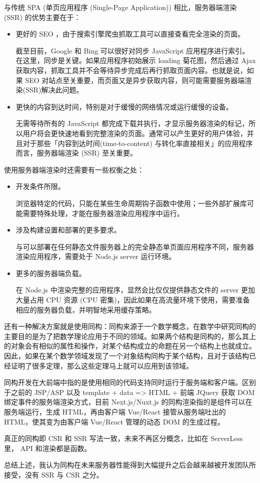 \documentclass{article}
\begin{document}
与传统 SPA (单页应用程序 (Single-Page Application\citep{mikowski2013single})) 相比，服务器端渲染 (SSR) 的优势主要在于：
\begin{itemize}
    \item 更好的 SEO ，由于搜索引擎爬虫抓取工具可以直接查看完全渲染的页面。\par
    截至目前，Google 和 Bing 可以很好对同步 JavaScript 应用程序进行索引。在这里，同步是关键。如果应用程序初始展示 loading 菊花图，然后通过 Ajax 获取内容，抓取工具并不会等待异步完成后再行抓取页面内容。也就是说，如果 SEO 对站点至关重要，而页面又是异步获取内容，则可能需要服务器端渲染(SSR)解决此问题。
    \item 更快的内容到达时间，特别是对于缓慢的网络情况或运行缓慢的设备。\par
    无需等待所有的 JavaScript 都完成下载并执行，才显示服务器渲染的标记，所以用户将会更快速地看到完整渲染的页面。通常可以产生更好的用户体验，并且对于那些「内容到达时间(time-to-content) 与转化率直接相关」的应用程序而言，服务器端渲染 (SSR) 至关重要。
\end{itemize}
使用服务器端渲染时还需要有一些权衡之处：
\begin{itemize}
    \item 开发条件所限。\par
    浏览器特定的代码，只能在某些生命周期钩子函数中使用；一些外部扩展库可能需要特殊处理，才能在服务器渲染应用程序中运行。
    \item 涉及构建设置和部署的更多要求。\par
    与可以部署在任何静态文件服务器上的完全静态单页面应用程序不同，服务器渲染应用程序，需要处于 Node.js server 运行环境。
    \item 更多的服务器端负载。\par
    在 Node.js 中渲染完整的应用程序，显然会比仅仅提供静态文件的 server 更加大量占用 CPU 资源 (CPU 密集)，因此如果在高流量环境下使用，需要准备相应的服务器负载，并明智地采用缓存策略。\par
\end{itemize}\par
还有一种解决方案就是使用同构：同构来源于一个数学概念，在数学中研究同构的主要目的是为了把数学理论应用于不同的领域。如果两个结构是同构的，那么其上的对象会有相似的属性和操作，对某个结构成立的命题在另一个结构上也就成立。因此，如果在某个数学领域发现了一个对象结构同构于某个结构，且对于该结构已经证明了很多定理，那么这些定理马上就可以应用到该领域。\par
同构开发在大前端中指的是使用相同的代码支持同时运行于服务端和客户端。区别于之前的 JSP/ASP 以及 template + data => HTML + 前端 JQuery 获取 DOM 绑定事件的服务端渲染方式，目前 Next.js/Nuxt.js 的同构渲染指的是组件可以在服务端运行，生成 HTML，再由客户端 Vue/React 接管从服务端吐出的 HTML，使其变为由客户端 Vue/React 管理的动态 DOM 的生成过程。\par
真正的同构即 CSR 和 SSR 写法一致，未来不再区分概念，比如在 ServerLess 里， API 和渲染都是函数。\par
总结上述，我认为同构在未来服务器性能得到大幅提升之后会越来越被开发团队所接受，没有 SSR 与 CSR 之分。
\end{document}
